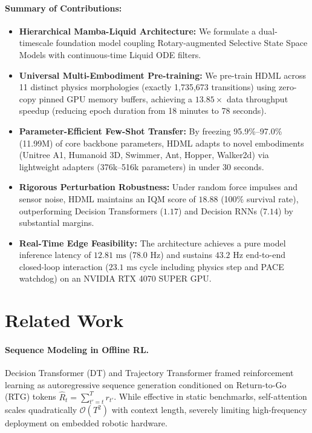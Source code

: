 \documentclass{article}
\begin{document}
\paragraph{Summary of Contributions:}
\begin{itemize}
    \item \textbf{Hierarchical Mamba-Liquid Architecture:} We formulate a dual-timescale foundation model coupling Rotary-augmented Selective State Space Models with continuous-time Liquid ODE filters.
    \item \textbf{Universal Multi-Embodiment Pre-training:} We pre-train HDML across 11 distinct physics morphologies (exactly 1,735,673 transitions) using zero-copy pinned GPU memory buffers, achieving a $13.85\times$ data throughput speedup (reducing epoch duration from 18 minutes to 78 seconds).
    \item \textbf{Parameter-Efficient Few-Shot Transfer:} By freezing 95.9\%--97.0\% (11.99M) of core backbone parameters, HDML adapts to novel embodiments (Unitree A1, Humanoid 3D, Swimmer, Ant, Hopper, Walker2d) via lightweight adapters (376k--516k parameters) in under 30 seconds.
    \item \textbf{Rigorous Perturbation Robustness:} Under random force impulses and sensor noise, HDML maintains an IQM score of $18.88$ (100\% survival rate), outperforming Decision Transformers ($1.17$) and Decision RNNs ($7.14$) by substantial margins.
    \item \textbf{Real-Time Edge Feasibility:} The architecture achieves a pure model inference latency of $12.81\text{ ms}$ ($78.0\text{ Hz}$) and sustains $43.2\text{ Hz}$ end-to-end closed-loop interaction ($23.1\text{ ms}$ cycle including physics step and PACE watchdog) on an NVIDIA RTX 4070 SUPER GPU.
\end{itemize}

\section{Related Work}
\label{sec:related_work}

\paragraph{Sequence Modeling in Offline RL.} 
Decision Transformer (DT) \cite{chen2021decision} and Trajectory Transformer framed reinforcement learning as autoregressive sequence generation conditioned on Return-to-Go (RTG) tokens $\hat{R}_t = \sum_{t'=t}^T r_{t'}$. While effective in static benchmarks, self-attention scales quadratically $\mathcal{O}(T^2)$ with context length, severely limiting high-frequency deployment on embedded robotic hardware.
\end{document}
